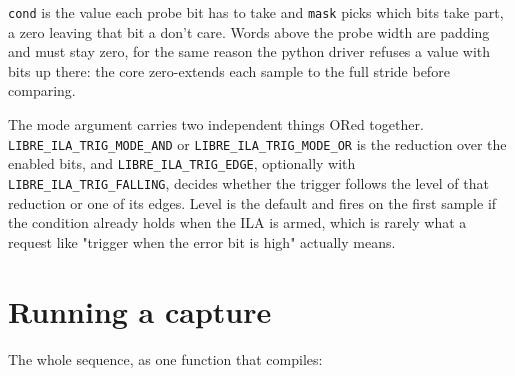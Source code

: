 \documentclass[../manual.tex]{subfiles}
\begin{document}
\texttt{cond} is the value each probe bit has to take and \texttt{mask} picks which bits take part, a zero leaving that bit a don't care. Words above the probe width are padding and must stay zero, for the same reason the python driver refuses a value with bits up there: the core zero-extends each sample to the full stride before comparing.

The mode argument carries two independent things ORed together. \texttt{LIBRE\_ILA\_TRIG\_MODE\_AND} or \texttt{LIBRE\_ILA\_TRIG\_MODE\_OR} is the reduction over the enabled bits, and \texttt{LIBRE\_ILA\_TRIG\_EDGE}, optionally with \texttt{LIBRE\_ILA\_TRIG\_FALLING}, decides whether the trigger follows the level of that reduction or one of its edges. Level is the default and fires on the first sample if the condition already holds when the ILA is armed, which is rarely what a request like "trigger when the error bit is high" actually means.

\section{Running a capture}
\label{sec:c_capture}

The whole sequence, as one function that compiles:
\end{document}
